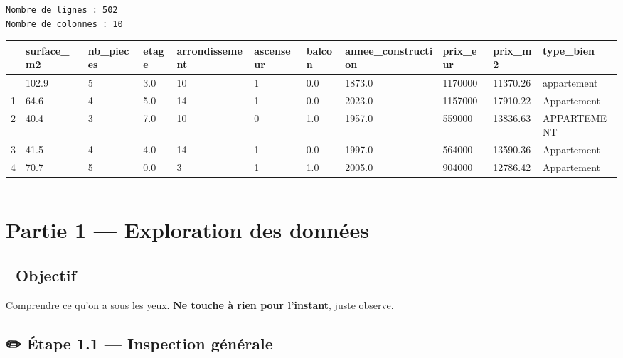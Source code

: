 \documentclass[
  french,
  11pt,
  a4paper,
]{scrbook}
\newcounter{none} %
\begin{document}
\begin{verbatim}
Nombre de lignes : 502
Nombre de colonnes : 10
\end{verbatim}

{\def\LTcaptype{none} %
\begin{longtable}[]{@{}lllllllllll@{}}
\toprule\noalign{}
& surface\_m2 & nb\_pieces & etage & arrondissement & ascenseur & balcon
& annee\_construction & prix\_eur & prix\_m2 & type\_bien \\
\midrule\noalign{}
\endhead
\bottomrule\noalign{}
\endlastfoot
0 & 102.9 & 5 & 3.0 & 10 & 1 & 0.0 & 1873.0 & 1170000 & 11370.26 &
appartement \\
1 & 64.6 & 4 & 5.0 & 14 & 1 & 0.0 & 2023.0 & 1157000 & 17910.22 &
Appartement \\
2 & 40.4 & 3 & 7.0 & 10 & 0 & 1.0 & 1957.0 & 559000 & 13836.63 &
APPARTEMENT \\
3 & 41.5 & 4 & 4.0 & 14 & 1 & 0.0 & 1997.0 & 564000 & 13590.36 &
Appartement \\
4 & 70.7 & 5 & 0.0 & 3 & 1 & 1.0 & 2005.0 & 904000 & 12786.42 &
Appartement \\
\end{longtable}
}

\begin{center}\rule{0.5\linewidth}{0.5pt}\end{center}

\chapter{Partie 1 --- Exploration des
données}\label{partie-1-exploration-des-donnuxe9es}

\section{🎯 Objectif}\label{objectif}

Comprendre ce qu'on a sous les yeux. \textbf{Ne touche à rien pour
l'instant}, juste observe.

\section{✏️ Étape 1.1 --- Inspection
générale}\label{uxe9tape-1.1-inspection-guxe9nuxe9rale}
\end{document}
